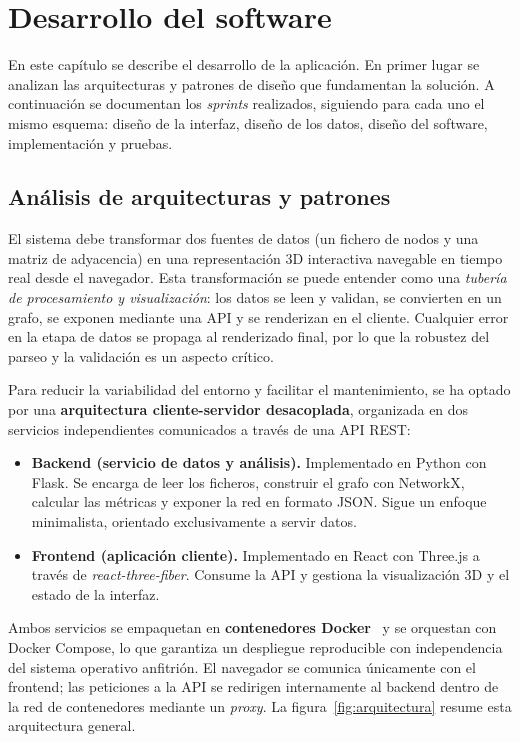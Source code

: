 \chapter{Desarrollo del software}

En este capítulo se describe el desarrollo de la aplicación. En primer lugar se analizan las
arquitecturas y patrones de diseño que fundamentan la solución. A continuación se documentan los
\textit{sprints} realizados, siguiendo para cada uno el mismo esquema: diseño de la interfaz, diseño
de los datos, diseño del software, implementación y pruebas.

\section{Análisis de arquitecturas y patrones}

El sistema debe transformar dos fuentes de datos (un fichero de nodos y una matriz de adyacencia)
en una representación 3D interactiva navegable en tiempo real desde el navegador. Esta
transformación se puede entender como una \textit{tubería de procesamiento y visualización}: los
datos se leen y validan, se convierten en un grafo, se exponen mediante una API y se renderizan en
el cliente. Cualquier error en la etapa de datos se propaga al renderizado final, por lo que la
robustez del parseo y la validación es un aspecto crítico.

Para reducir la variabilidad del entorno y facilitar el mantenimiento, se ha optado por una
\textbf{arquitectura cliente-servidor desacoplada}, organizada en dos servicios independientes
comunicados a través de una API REST:

\begin{itemize}
	\item \textbf{Backend (servicio de datos y análisis).} Implementado en Python con Flask. Se
		encarga de leer los ficheros, construir el grafo con NetworkX, calcular las métricas y
		exponer la red en formato JSON. Sigue un enfoque minimalista, orientado exclusivamente a
		servir datos.
	\item \textbf{Frontend (aplicación cliente).} Implementado en React con Three.js a través de
		\textit{react-three-fiber}. Consume la API y gestiona la visualización 3D y el estado de la
		interfaz.
\end{itemize}

Ambos servicios se empaquetan en \textbf{contenedores Docker}~\cite{docker} y se orquestan con
Docker Compose, lo que garantiza un despliegue reproducible con independencia del sistema operativo
anfitrión. El
navegador se comunica únicamente con el frontend; las peticiones a la API se redirigen
internamente al backend dentro de la red de contenedores mediante un \textit{proxy}. La
figura~\ref{fig:arquitectura} resume esta arquitectura general.

